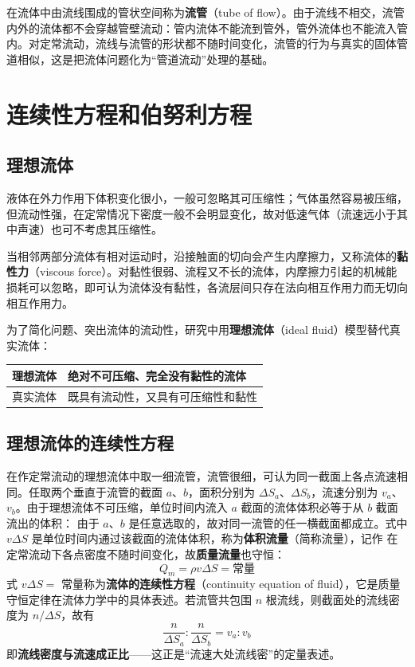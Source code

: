     在流体中由流线围成的管状空间称为\textbf{流管}（tube of flow）。由于流线不相交，流管内外的流体都不会穿越管壁流动：管内流体不能流到管外，管外流体也不能流入管内。对定常流动，流线与流管的形状都不随时间变化，流管的行为与真实的固体管道相似，这是把流体问题化为“管道流动”处理的基础。

\section{连续性方程和伯努利方程}
    \subsection{理想流体}
    液体在外力作用下体积变化很小，一般可忽略其可压缩性；气体虽然容易被压缩，但流动性强，在定常情况下密度一般不会明显变化，故对低速气体（流速远小于其中声速）也可不考虑其压缩性。

    当相邻两部分流体有相对运动时，沿接触面的切向会产生内摩擦力，又称流体的\textbf{黏性力}（viscous force）。对黏性很弱、流程又不长的流体，内摩擦力引起的机械能损耗可以忽略，即可认为流体没有黏性，各流层间只存在法向相互作用力而无切向相互作用力。

    为了简化问题、突出流体的流动性，研究中用\textbf{理想流体}（ideal fluid）模型替代真实流体：
    \begin{center}
    \begin{tabular}{ll}
    \toprule
    理想流体 & 绝对不可压缩、完全没有黏性的流体 \\
    \midrule
    真实流体 & 既具有流动性，又具有可压缩性和黏性 \\
    \bottomrule
    \end{tabular}
    \end{center}

    \subsection{理想流体的连续性方程}
    在作定常流动的理想流体中取一细流管，流管很细，可认为同一截面上各点流速相同。任取两个垂直于流管的截面 $a$、$b$，面积分别为 $\Delta S_{a}$、$\Delta S_{b}$，流速分别为 $v_{a}$、$v_{b}$。由于理想流体不可压缩，单位时间内流入 $a$ 截面的流体体积必等于从 $b$ 截面流出的体积：
    由于 $a$、$b$ 是任意选取的，故对同一流管的任一横截面都成立。式中 $v\Delta S$ 是单位时间内通过该截面的流体体积，称为\textbf{体积流量}（简称流量），记作
    在定常流动下各点密度不随时间变化，故\textbf{质量流量}也守恒：
    \[
    Q_{m}=\rho v\Delta S=\text{常量}
    \]
    式 $v\Delta S=$ 常量称为\textbf{流体的连续性方程}（continuity equation of fluid），它是质量守恒定律在流体力学中的具体表述。若流管共包围 $n$ 根流线，则截面处的流线密度为 $n/\Delta S$，故有
    \[
    \frac{n}{\Delta S_{a}}:\frac{n}{\Delta S_{b}}=v_{a}:v_{b}
    \]
    即\textbf{流线密度与流速成正比}——这正是“流速大处流线密”的定量表述。

